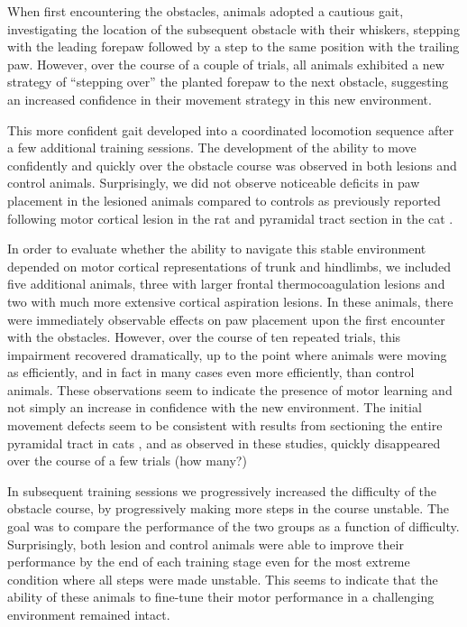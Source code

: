 When first encountering the obstacles, animals adopted a cautious gait, investigating the location of the subsequent obstacle with their whiskers, stepping with the leading forepaw followed by a step to the same position with the trailing paw. However, over the course of a couple of trials, all animals exhibited a new strategy of ``stepping over'' the planted forepaw to the next obstacle, suggesting an increased confidence in their movement strategy in this new environment.

This more confident gait developed into a coordinated locomotion sequence after a few additional training sessions. The development of the ability to move confidently and quickly over the obstacle course was observed in both lesions and control animals. Surprisingly, we did not observe noticeable deficits in paw placement in the lesioned animals compared to controls as previously reported following motor cortical lesion in the rat \cite{Metz2002} and pyramidal tract section in the cat \cite{Liddell1944}.

In order to evaluate whether the ability to navigate this stable environment depended on motor cortical representations of trunk and hindlimbs, we included five additional animals, three with larger frontal thermocoagulation lesions and two with much more extensive cortical aspiration lesions. In these animals, there were immediately observable effects on paw placement upon the first encounter with the obstacles. However, over the course of ten repeated trials, this impairment recovered dramatically, up to the point where animals were moving as efficiently, and in fact in many cases even more efficiently, than control animals. These observations seem to indicate the presence of motor learning and not simply an increase in confidence with the new environment. The initial movement defects seem to be consistent with results from sectioning the entire pyramidal tract in cats \cite{Liddell1944}, and as observed in these studies, quickly disappeared over the course of a few trials (how many?)

In subsequent training sessions we progressively increased the difficulty of the obstacle course, by progressively making more steps in the course unstable. The goal was to compare the performance of the two groups as a function of difficulty. Surprisingly, both lesion and control animals were able to improve their performance by the end of each training stage even for the most extreme condition where all steps were made unstable. This seems to indicate that the ability of these animals to fine-tune their motor performance in a challenging environment remained intact.

